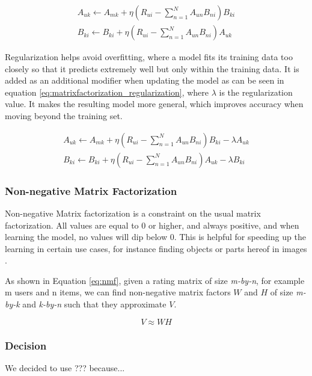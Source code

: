 \begin{equation}\label{eq:matrixfactorization_learningrate}
	\begin{split}
	A_{uk}\leftarrow A_{mk} + \eta(R_{ui}-\sum_{n=1}^{N}A_{un}B_{ni})B_{ki}
	\\
	B_{ki}\leftarrow B_{ki} + \eta(R_{ui}-\sum_{n=1}^{N}A_{un}B_{ni})A_{uk}
	\end{split}
\end{equation}

Regularization helps avoid overfitting, where a model fits its training data too closely so that it predicts extremely well but only within the training data. It is added as an additional modifier when updating the model as can be seen in equation \ref{eq:matrixfactorization_regularization}, where $\lambda$ is the regularization value. It makes the resulting model more general, which improves accuracy when moving beyond the training set.

\begin{equation}\label{eq:matrixfactorization_regularization}
	\begin{split}
	A_{uk}\leftarrow A_{mk} + \eta(R_{ui}-\sum_{n=1}^{N}A_{un}B_{ni})B_{ki}-\lambda A_{uk}
	\\
	B_{ki}\leftarrow B_{ki} + \eta(R_{ui}-\sum_{n=1}^{N}A_{un}B_{ni})A_{uk} -\lambda B_{ki}
	\end{split}
\end{equation}

\subsubsection{Non-negative Matrix Factorization}

Non-negative Matrix factorization is a constraint on the usual matrix factorization. All values are equal to 0 or higher, and always positive, and when learning the model, no values will dip below 0. This is helpful for speeding up the learning in certain use cases, for instance finding objects or parts hereof in images \cite{nnmf}.

As shown in Equation \ref{eq:nmf}, given a rating matrix of size \textit{m-by-n}, for example m users and n items, we can find non-negative matrix factors $W$ and $H$ of size \textit{m-by-k} and \textit{k-by-n} such that they approximate $V$.

\begin{equation} \label{eq:nmf}
	V \approx W H
\end{equation}

\subsubsection{Decision}\label{sec:decision} %
We decided to use ??? because...

